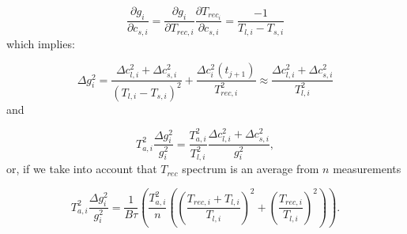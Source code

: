\begin{equation}
 \frac{\partial g_{i}}{\partial c_{s,i}} = \frac{\partial g_{i}}{\partial T_{rec,i}}\frac{\partial T_{rec_{i}}}{\partial c_{s,i}} =
\frac{-1}{T_{l,i}-T_{s,i}} 
\end{equation}
which implies:

\begin{equation}
\Delta g_{i}^{2} =  \frac{\Delta c_{l,i}^{2} + \Delta c_{s,i}^{2}}{(T_{l,i}-T_{s,i})^2} + \frac{ \Delta c_{i}^{2}(t_{j+1})}{T_{rec,i}^{2}}
\approx \frac{\Delta c_{l,i}^{2} + \Delta c_{s,i}^{2}}{T_{l,i}^2}
\end{equation}
and

\begin{equation}
T_{a,i}^{2}\frac{\Delta g_{i}^{2}}{g_{i}^2} = \frac{T_{a,i}^{2}}{T_{l,i}^2} \frac{\Delta c_{l,i}^{2} + \Delta c_{s,i}^{2}}{g_{i}^{2}},
\end{equation}
or, if we take into account that \(T_{rec}\) spectrum is an average from \(n\) measurements

\begin{equation}
 T_{a,i}^{2}\frac{\Delta g_{i}^{2}}{g_{i}^2} =  \frac{1}{B\tau} \left(
   \frac{T_{a,i}^{2}}{n} \left( \left( \frac{T_{rec,i} + T_{l,i}}{T_{l,i}} \right)^2 + \left( \frac{T_{rec,i} }{T_{l,i}} \right)^2 \right) \right).
\end{equation}





